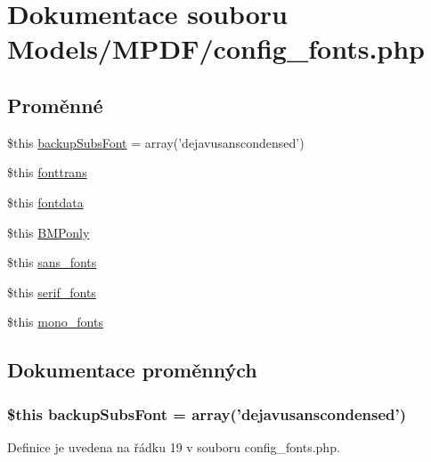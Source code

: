 \hypertarget{config__fonts_8php}{\section{Dokumentace souboru Models/\-M\-P\-D\-F/config\-\_\-fonts.php}
\label{config__fonts_8php}
}
\subsection*{Proměnné}
\begin{DoxyCompactItemize}
\item 
\$this \hyperlink{config__fonts_8php_ae4f37aa62ca13f57c38bff1aefde7bd4}{backup\-Subs\-Font} = array('dejavusanscondensed')
\item 
\$this \hyperlink{config__fonts_8php_a3ea01491bf16c688ebd3fdb160544418}{fonttrans}
\item 
\$this \hyperlink{config__fonts_8php_a75d3623c25db4c42e42da8e5e1361292}{fontdata}
\item 
\$this \hyperlink{config__fonts_8php_a4cae730e8755c0dac19a7b97d9cdff30}{B\-M\-Ponly}
\item 
\$this \hyperlink{config__fonts_8php_ac4f4a6e2648cc43b33ef4a97b080ece2}{sans\-\_\-fonts}
\item 
\$this \hyperlink{config__fonts_8php_ae21efe613417a958d74084fa09721bdf}{serif\-\_\-fonts}
\item 
\$this \hyperlink{config__fonts_8php_a96d0c9a2044c13a6fc48a7ee36658b18}{mono\-\_\-fonts}
\end{DoxyCompactItemize}


\subsection{Dokumentace proměnných}
\hypertarget{config__fonts_8php_ae4f37aa62ca13f57c38bff1aefde7bd4}{
\subsubsection[{backup\-Subs\-Font}]{\setlength{\rightskip}{0pt plus 5cm}\$this backup\-Subs\-Font = array('dejavusanscondensed')}}\label{config__fonts_8php_ae4f37aa62ca13f57c38bff1aefde7bd4}


Definice je uvedena na řádku 19 v souboru config\-\_\-fonts.\-php.



